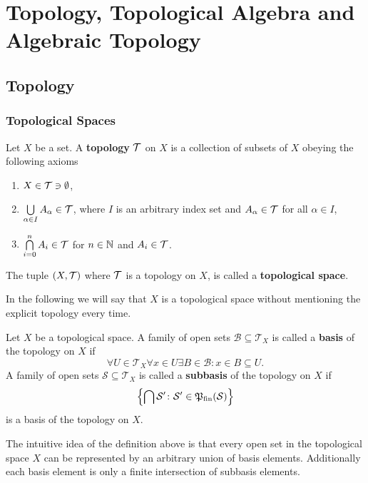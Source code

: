 \section{Topology, Topological Algebra and Algebraic Topology}
\subsection{Topology}

\subsubsection{Topological Spaces}
\begin{defin}
  Let $X$ be a set. A \textbf{topology} $\mathcal{T}$ on $X$ is a collection of subsets of $X$ obeying the following axioms
  \begin{enumerate}
    \item $X \in \mathcal{T} \ni \emptyset$,
    \item $\bigcup\limits_{\alpha \in I}A_{\alpha} \in \mathcal{T}$, where $I$ is an arbitrary index set and $A_{\alpha} \in \mathcal{T}$ for all $\alpha \in I$,
    \item $\bigcap\limits_{i=0}^n A_i \in \mathcal{T}$ for $n \in \mathbb{N}$ and $A_i \in \mathcal{T}$.
  \end{enumerate}
  
  The tuple $(X, \mathcal{T})$ where $\mathcal{T}$ is a topology on $X$, is called a \textbf{topological space}.
\end{defin}

In the following we will say that $X$ is a topological space without mentioning the explicit topology every time. 

\begin{defin}
  Let $X$ be a topological space. A family of open sets $\mathcal{B} \subseteq \mathcal{T}_X$ is called a \textbf{basis} of the topology on $X$ if
  \begin{equation*}
    \forall U \in \mathcal{T}_X\forall x \in U\exists B \in\mathcal{B}\colon x \in B \subseteq U.
  \end{equation*}
  A family of open sets $\mathcal{S} \subseteq \mathcal{T}_X$ is called a \textbf{subbasis} of the topology on $X$ if
  \begin{equation*}
    \left\{\bigcap \mathcal{S}'\colon \mathcal{S}'\in \mathfrak{P}_{\text{fin}}(\mathcal{S})\right\}
  \end{equation*}
  is a basis of the topology on $X$.
\end{defin}
The intuitive idea of the definition above is that every open set in the topological space $X$ can be represented by an arbitrary union of basis elements. Additionally each basis element is only a finite intersection of subbasis elements.

